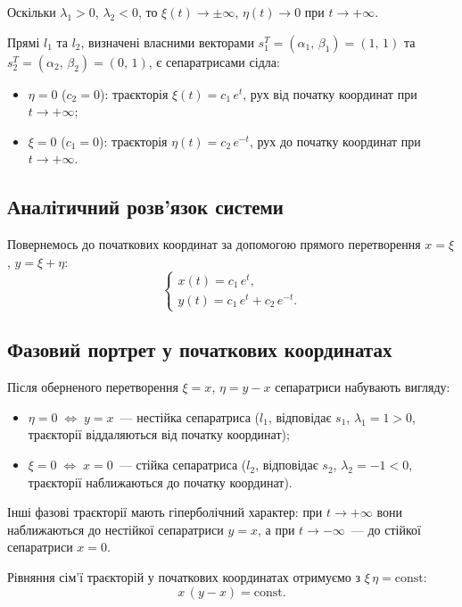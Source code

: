 \documentclass[12pt,a4paper]{article}
\begin{document}
Оскільки $\lambda_1 > 0$, $\lambda_2 < 0$, то $\xi(t) \to \pm\infty$, $\eta(t) \to 0$ при $t \to +\infty$.

Прямі $l_1$ та $l_2$, визначені власними векторами $s_1^T = (\alpha_1,\,\beta_1) = (1,\,1)$ та $s_2^T = (\alpha_2,\,\beta_2) = (0,\,1)$, є сепаратрисами сідла:
\begin{itemize}
    \item $\eta = 0$ ($c_2 = 0$): траєкторія $\xi(t) = c_1\,e^t$, рух від початку координат при $t \to +\infty$;
    \item $\xi = 0$ ($c_1 = 0$): траєкторія $\eta(t) = c_2\,e^{-t}$, рух до початку координат при $t \to +\infty$.
\end{itemize}

\subsection{Аналітичний розв'язок системи}

Повернемось до початкових координат за допомогою прямого перетворення $x = \xi$, $y = \xi + \eta$:
\[
\begin{cases}
x(t) = c_1\,e^t,\\
y(t) = c_1\,e^t + c_2\,e^{-t}.
\end{cases}
\]

\subsection{Фазовий портрет у початкових координатах}

Після оберненого перетворення $\xi = x$, $\eta = y - x$ сепаратриси набувають вигляду:
\begin{itemize}
    \item $\eta = 0 \;\Leftrightarrow\; y = x$~--- нестійка сепаратриса ($l_1$, відповідає $s_1$, $\lambda_1 = 1 > 0$, траєкторії віддаляються від початку координат);
    \item $\xi = 0 \;\Leftrightarrow\; x = 0$~--- стійка сепаратриса ($l_2$, відповідає $s_2$, $\lambda_2 = -1 < 0$, траєкторії наближаються до початку координат).
\end{itemize}

Інші фазові траєкторії мають гіперболічний характер: при $t \to +\infty$ вони наближаються до нестійкої сепаратриси $y = x$, а при $t \to -\infty$~--- до стійкої сепаратриси $x = 0$.

Рівняння сім'ї траєкторій у початкових координатах отримуємо з $\xi\,\eta = \mathrm{const}$:
\[
x\,(y - x) = \mathrm{const}.
\]
\end{document}
